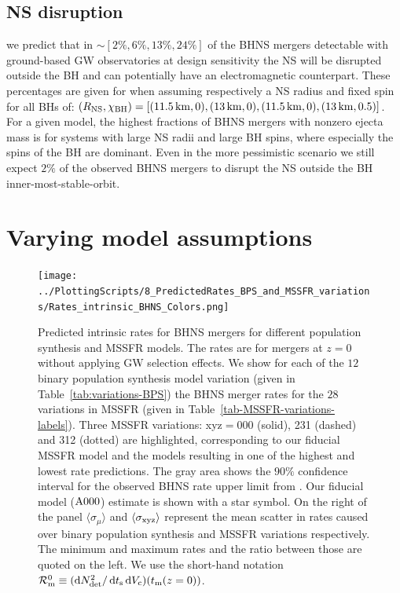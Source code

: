 \documentclass[twocolumn]{aastex63}
\newcommand\rate{\mathcal{R}}
\newcommand\bhnsSingle{BHNS\xspace}
\newcommand{\km}{\ensuremath{\,\rm{km}}\xspace}
\newcommand{\ts}{\ensuremath{{t}_{\rm{s}}}\xspace}
\newcommand{\tmerger}{\ensuremath{{t}_{\rm{m}}}\xspace}
\newcommand{\Ndet}{\ensuremath{{N}_{\rm{det}}}\xspace}
\newcommand{\Vc}{\ensuremath{{V}_{\rm{c}}}\xspace}
\newcommand*\diff{\mathop{}\!\mathrm{d}}
\newcommand{\chibh}{\ensuremath{{\chi}_{\rm{BH}}}\xspace}
\newcommand{\mAzero}{\ensuremath{\rm{A}000}\xspace}
\newcommand{\NmodelsBPS}{\ensuremath{12}\xspace}
\newcommand{\NmodelsMSSFR}{\ensuremath{28}\xspace}
\begin{document}
\subsection{\ac{NS} disruption} 
we predict that in $\sim [2\%, 6\%, 13\%, 24\% ]$ of the \bhnsSingle mergers detectable with ground-based \ac{GW} observatories at design sensitivity the \ac{NS} will be disrupted outside the \ac{BH} and can potentially have an electromagnetic counterpart. These percentages are given for when assuming respectively a \ac{NS} radius and fixed spin for all \acp{BH} of: $(R_{\rm{NS}}, \chibh) = [(11.5\km,0), (13\km,0), (11.5\km, 0), (13\km, 0.5)]$. For a given model, the highest fractions of \bhnsSingle mergers with nonzero ejecta mass is for systems with large \ac{NS} radii and large BH spins, where especially the spins of the \ac{BH} are dominant.  Even in the more pessimistic scenario we still expect $2\%$ of the observed \bhnsSingle mergers to disrupt the \ac{NS} outside the \ac{BH} inner-most-stable-orbit. 








\section{Varying model assumptions}
\label{sec:results-variations}
%



\begin{figure}
    \centering
\texttt{[image: ../PlottingScripts/8\_PredictedRates\_BPS\_and\_MSSFR\_variations/Rates\_intrinsic\_BHNS\_Colors.png]} %
    \caption{Predicted intrinsic rates for BHNS mergers  for different population synthesis and MSSFR models.  
    The rates are for mergers at $z=0$ without applying \ac{GW} selection effects. 
    We show for each of the \NmodelsBPS binary population synthesis model variation (given in Table~\ref{tab:variations-BPS}) the \bhnsSingle merger rates for the \NmodelsMSSFR variations in \ac{MSSFR} (given in Table~\ref{tab-MSSFR-variations-labels}). 
    Three \ac{MSSFR} variations: \rm{xyz}$=$000 (solid), 231 (dashed) and 312 (dotted)  are highlighted,  corresponding to our fiducial \ac{MSSFR} model and the models resulting in one of the highest and lowest rate predictions. The gray area shows the $90\%$ confidence interval for the observed \bhnsSingle rate  upper limit from  \citep{2019PhRvX...9c1040A}. Our fiducial model  (\mAzero) estimate is shown with a star symbol. On the right of the  panel  $\langle \sigma_{\mu}\rangle$ and $\langle \sigma_{\rm{xyz}}\rangle$ represent the mean scatter  in  rates caused over binary population synthesis and \ac{MSSFR} variations respectively. The minimum and maximum rates and the ratio between those are quoted on the left.  We use the short-hand notation $\rate_{\rm{m}}^0 \equiv (\diff \Ndet^2 / \diff \ts \diff \Vc)(\tmerger(z=0))$. }%
    \label{fig:IntrinsicRates}
\end{figure}
%
\end{document}
